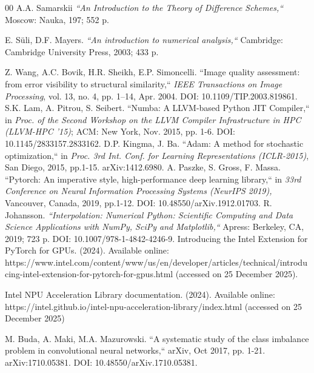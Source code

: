 \documentclass{ieeeaccess}
\begin{document}
{\begin{thebibliography}{00}
A.A. Samarskii  \textit {``An Introduction to the Theory of Difference Schemes,``} Moscow: Nauka, 197; 552 p.

E. Süli, D.F. Mayers.  
\textit {``An introduction to numerical analysis,``} 
Cambridge: Cambridge University Press, 2003; 433 p.

Z. Wang, A.C. Bovik, H.R. Sheikh, E.P. Simoncelli.
``Image quality assessment: from error visibility to structural similarity,`` 
  \emph {IEEE Transactions on Image Processing}, 
 vol. 13, no. 4, pp. 1–14, Apr. 2004.
 DOI: 10.1109/TIP.2003.819861.
S.K. Lam,  A. Pitrou, S. Seibert. 
``Numba: A LLVM-based Python JIT Compiler,`` 
in \emph {Proc. of the Second Workshop on the LLVM Compiler Infrastructure in HPC (LLVM-HPC '15)}; ACM: New York, Nov. 2015, pp. 1-6.
DOI: 10.1145/2833157.2833162.
D.P. Kingma, J. Ba.  
``Adam: A method for stochastic optimization,`` 
in \emph {Proc. 3rd Int. Conf. for Learning Representations (ICLR-2015)}, San Diego, 2015, pp.1-15. arXiv:1412.6980.
A. Paszke, S. Gross,  F.  Massa. 
``Pytorch: An imperative style, high-performance deep learning library,`` 
in \emph{ 33rd Conference on Neural Information Processing Systems (NeurIPS 2019),} Vancouver, Canada, 
2019,  pp.1-12.
DOI: 10.48550/arXiv.1912.01703.
 R. Johansson. \textit {``Interpolation: Numerical Python: Scientific Computing and Data Science Applications with NumPy, SciPy and Matplotlib,``} Apress: Berkeley, CA, 2019; 723 p.  
DOI: 10.1007/978-1-4842-4246-9.
Introducing the Intel Extension for PyTorch for GPUs. (2024). Available online: https://www.intel.com/content/www/us/en/de\-veloper/articles/technical/introducing-intel-extension-for-pytorch-for-gpus.html (accessed on 25 December 2025).

Intel NPU Acceleration Library documentation. (2024). Available online: 
https://intel.github.io/intel-npu-acceleration-library/index.html
 (accessed on 25 December 2025)

M. Buda, A. Maki, M.A. Mazurowski.
``A systematic study of the class imbalance problem in convolutional neural networks,`` arXiv, Oct 2017, pp. 1-21.
arXiv:1710.05381.
DOI: 10.48550/arXiv.1710.05381.


\end{thebibliography}}
\end{document}
